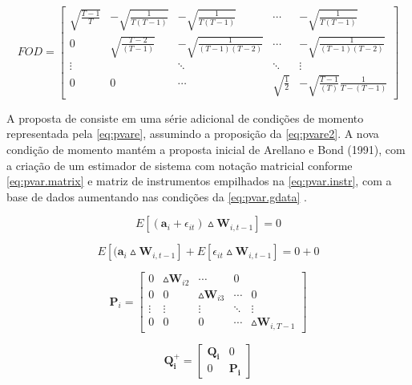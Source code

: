 \documentclass[
  12pt,
  12pt,
  openright,
  oneside,
  a4paper,
  chapter=TITLE,
  section=TITLE,
  subsection=TITLE,
  subsubsection=TITLE,
  english,
  portugues,
  sumario=tradicional]{abntex2}
\begin{document}
\begin{equation}\label{eq:fod}
FOD = \left[ \begin{array}{ccccc}
\sqrt{\frac{T-1}{T}}  & - \sqrt{\frac{1}{T(T - 1)}} & - \sqrt{\frac{1}{T(T - 1)}} & \cdots & - \sqrt{\frac{1}{T(T - 1)}}  \\
0 & \sqrt{\frac{T - 2 }{(T - 1)}} & - \sqrt{\frac{1}{(T - 1)(T - 2 )}} & \cdots &  - \sqrt{\frac{1}{(T - 1)(T - 2 )}} \\
\vdots & & \ddots & \ddots & \vdots \\
0 & 0 & \cdots & \sqrt{\frac{1}{2}} & - \sqrt{\frac{T - 1}{(T)}}\frac{1}{T-(T-1)}
\end{array}\right]
\end{equation}

A proposta de \textcite{blundelbond:1998} consiste em uma série adicional de condições de momento representada pela \autoref{eq:pvare}, assumindo a proposição da \autoref{eq:pvare2}. A nova condição de momento mantém a proposta inicial de Arellano e Bond (1991), com a criação de um estimador de sistema com notação matricial conforme \autoref{eq:pvar.matrix} e matriz de instrumentos empilhados na \autoref{eq:pvar.instr}, com a base de dados aumentando nas condições da \autoref{eq:pvar.gdata} \cite{sigmund:2008}.

\begin{equation}\label{eq:pvare}
E[(\mathbf{a}_{i} + \epsilon_{it}) \vartriangle\mathbf{W}_{i, t-1}] = 0
\end{equation}

\begin{equation}\label{eq:pvare2}
E[(\mathbf{a}_{i} \vartriangle\mathbf{W}_{i, t-1}]  +  E[\epsilon_{it}\vartriangle\mathbf{W}_{i, t-1}] = 0 + 0
\end{equation}

\begin{equation}\label{eq:pvar.matrix}
\mathbf{P}_{i} = \left[\begin{array}{ccccc}
0 & \vartriangle\mathbf{W}_{i2} & \cdots & 0 \\
0 & 0 &  \vartriangle\mathbf{W}_{i3} & \cdots & 0 \\
\vdots & \vdots & \vdots & \ddots & \vdots \\
0 & 0 & 0 & \cdots & \vartriangle\mathbf{W}_{i, T-1}
\end{array}\right]
\end{equation}

\begin{equation}\label{eq:pvar.instr}
\mathbf{Q^{+}_{i}} = \left[\begin{array}{cc}
\mathbf{Q_{i}} & 0 \\
0 & \mathbf{P_{i}}
\end{array}\right]
\end{equation}
\end{document}
